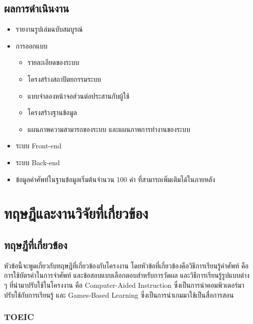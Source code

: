 \documentclass[12pt,oneside,openright,a4paper]{cpe-thai-project}
\begin{document}
\section{ผลการดำเนินงาน}

\begin{itemize}
	\item รายงานรูปเล่มฉบับสมบูรณ์
	\item การออกแบบ
	      \begin{itemize}
		      \item รายละเอียดของระบบ
		      \item โครงสร้างสถาปัตยกรรมระบบ
		      \item แบบจำลองหน้าจอส่วนต่อประสานกับผู้ใช้
		      \item โครงสร้างฐานข้อมูล
		      \item แผนภาพความสามารถของระบบ และแผนภาพการทำงานของระบบ
	      \end{itemize}
	\item ระบบ Front-end
	\item ระบบ Back-end
	\item ข้อมูลคำศัพท์ในฐานข้อมูลเริ่มต้นจำนวน 100 คำ ที่สามารถเพิ่มเติมได้ในภายหลัง
\end{itemize}


\chapter{ทฤษฎีและงานวิจัยที่เกี่ยวข้อง}


\section{ทฤษฎีที่เกี่ยวข้อง}

\hspace{1cm}
หัวข้อนี้จะพูดเกี่ยวกับทฤษฎีที่เกี่ยวข้องกับโครงงาน โดยหัวข้อที่เกี่ยวข้องคือวิธีการเรียนรู้คำศัพท์
คือการใช้บัตรคำในการจำศัพท์ และข้อสอบแบบเลือกตอบสำหรับการวัดผล และวิธีการเรียนรู้รูปแบบต่าง ๆ
ที่นำมาปรับใช้ในโครงงาน คือ Computer-Aided Instruction ซึ่งเป็นการนำคอมพิวเตอร์มาปรับใช้กับการเรียนรู้
และ Games-Based Learning ซึ่งเป็นการนำเกมมาใช้เป็นสื่อการสอน

\subsection{TOEIC}
\end{document}
